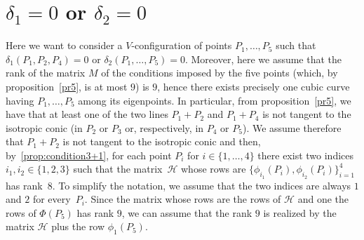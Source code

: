 \documentclass[12pt, a4paper, reqno, captions=tableheading,bibliography=totoc]{scrartcl}
\theoremstyle{plain}
\theoremstyle{definition}
\begin{document}
\section{$\delta_1=0$ or $\delta_2=0$}

Here we want to consider a $V$-configuration of points $P_1, \dots, P_5$
such that $\delta_1(P_1, P_2, P_4) = 0$ or $\delta_2(P_1, \dots, P_5) = 0$.
Moreover, here we assume that the rank of the matrix $M$
of the conditions imposed by
the five points (which, by proposition~\ref{pr5}, is at most $9$)
is $9$, hence there exists precisely one cubic curve having
$P_1, \dots, P_5$ among its eigenpoints. In particular, from
proposition~\ref{pr5}, we have that at least one of the two lines
$P_1+P_2$ and $P_1+P_4$ is not tangent to the isotropic conic (in $P_2$
or $P_3$ or, respectively, in $P_4$ or $P_5$). We assume therefore that
$P_1+P_2$ is not tangent to the isotropic conic and then,
by~\ref{prop:condition3+1}, for each point $P_i$ for $i \in
\{1,\dotsc,4\}$ there exist
two indices $i_1, i_2 \in \{1,2,3\}$ such that the matrix~$\mathcal{H}$
whose rows are $\{ \phi_{i_1}(P_i), \phi_{i_2}(P_i)\}_{i=1}^4$ has rank~$8$.
To simplify the notation, we assume that the two indices are always $1$ and
$2$ for every~$P_i$.
Since the matrix whose rows are the rows of
$\mathcal{H}$ and one the rows of $\Phi(P_5)$ has rank $9$, we
can assume that the rank $9$ is realized by the matrix $\mathcal{H}$ plus
the row $\phi_1(P_5)$.
\end{document}

